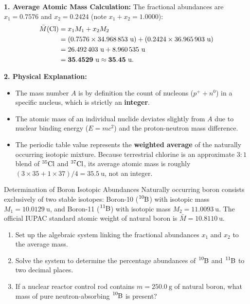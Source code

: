 \begin{tabletworkspace}[5.0cm]
\end{tabletworkspace}

\begin{solution}
\textbf{1. Average Atomic Mass Calculation:}
The fractional abundances are $x_1 = 0.7576$ and $x_2 = 0.2424$ (note $x_1 + x_2 = 1.0000$):
\begin{align*}
\bar{M}(\ce{Cl}) &= x_1 M_1 + x_2 M_2 \\
                 &= (0.7576 \times 34.968\,853\ \mathrm{u}) + (0.2424 \times 36.965\,903\ \mathrm{u}) \\
                 &= 26.492\,403\ \mathrm{u} + 8.960\,535\ \mathrm{u} \\
                 &= \mathbf{35.4529\ \mathrm{u}} \approx \mathbf{35.45\ \mathrm{u}}.
\end{align*}

\textbf{2. Physical Explanation:}
\begin{itemize}[leftmargin=1.5em,itemsep=2pt]
  \item The mass number $A$ is by definition the count of nucleons ($p^+ + n^0$) in a specific nucleus, which is strictly an \textbf{integer}.
  \item The atomic mass of an individual nuclide deviates slightly from $A$ due to nuclear binding energy ($E = mc^2$) and the proton-neutron mass difference.
  \item The periodic table value represents the \textbf{weighted average} of the naturally occurring isotopic mixture. Because terrestrial chlorine is an approximate $3:1$ blend of $^{35}\ce{Cl}$ and $^{37}\ce{Cl}$, its average atomic mass is roughly $(3 \times 35 + 1 \times 37)/4 = 35.5\ \mathrm{u}$, not an integer.
\end{itemize}
\end{solution}

\begin{exercise}{Determination of Boron Isotopic Abundances}
Naturally occurring boron consists exclusively of two stable isotopes: Boron-10 ($\ce{^{10}B}$) with isotopic mass $M_1 = 10.0129\ \mathrm{u}$, and Boron-11 ($\ce{^{11}B}$) with isotopic mass $M_2 = 11.0093\ \mathrm{u}$. The official IUPAC standard atomic weight of natural boron is $\bar{M} = 10.8110\ \mathrm{u}$.
\begin{enumerate}[leftmargin=1.5em,itemsep=2pt]
  \item Set up the algebraic system linking the fractional abundances $x_1$ and $x_2$ to the average mass.
  \item Solve the system to determine the percentage abundances of $\ce{^{10}B}$ and $\ce{^{11}B}$ to two decimal places.
  \item If a nuclear reactor control rod contains $m = 250.0\ \mathrm{g}$ of natural boron, what mass of pure neutron-absorbing $\ce{^{10}B}$ is present?
\end{enumerate}
\end{exercise}

